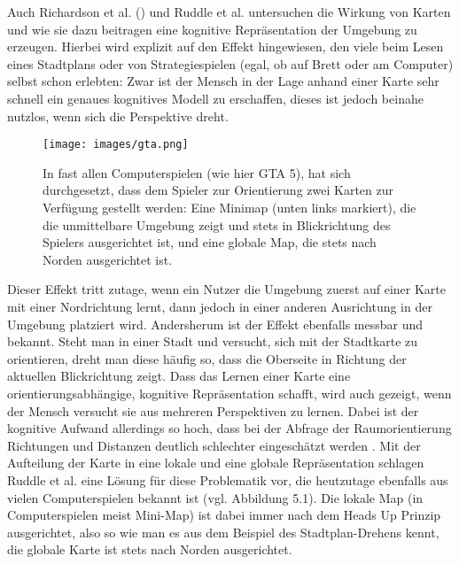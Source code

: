 Auch Richardson et al. (\cite{Richardson1999}) und Ruddle et al. \cite{Ruddle1999TheEnvironments} untersuchen die Wirkung von Karten und wie sie dazu beitragen eine kognitive Repräsentation der Umgebung zu erzeugen.
Hierbei wird explizit auf den Effekt hingewiesen, den viele beim Lesen eines Stadtplans oder von Strategiespielen (egal, ob auf Brett oder am Computer) selbst schon erlebten: Zwar ist der Mensch in der Lage anhand einer Karte sehr schnell ein genaues kognitives Modell zu erschaffen, dieses ist jedoch beinahe nutzlos, wenn sich die Perspektive dreht.


\begin{figure}[h]
  \centering
  \texttt{[image: images/gta.png]}
  \caption{In fast allen Computerspielen (wie hier GTA 5), hat sich durchgesetzt, dass dem Spieler zur Orientierung zwei Karten zur Verfügung gestellt werden: Eine Minimap (unten links markiert), die die unmittelbare Umgebung zeigt und stets in Blickrichtung des Spielers ausgerichtet ist, und eine globale Map, die stets nach Norden ausgerichtet ist.}
  \label{fig:todo}
\end{figure}

Dieser Effekt tritt zutage, wenn ein Nutzer die Umgebung zuerst auf einer Karte mit einer Nordrichtung lernt, dann jedoch in einer anderen Ausrichtung in der Umgebung platziert wird. Andersherum ist der Effekt ebenfalls messbar und bekannt. Steht man in einer Stadt und versucht, sich mit der Stadtkarte zu orientieren, dreht man diese häufig so, dass die Oberseite in Richtung der aktuellen Blickrichtung zeigt. Dass das Lernen einer Karte eine orientierungsabhängige, kognitive Repräsentation schafft, wird auch gezeigt, wenn der Mensch versucht sie aus mehreren Perspektiven zu lernen. Dabei ist der kognitive Aufwand allerdings so hoch, dass bei der Abfrage der Raumorientierung Richtungen und Distanzen deutlich schlechter eingeschätzt werden \cite{Richardson1999}.
Mit der Aufteilung der Karte in eine lokale und eine globale Repräsentation schlagen Ruddle et al. \cite{Ruddle1999TheEnvironments} eine Lösung für diese Problematik vor, die heutzutage ebenfalls aus vielen Computerspielen bekannt ist (vgl. Abbildung 5.1). Die lokale Map (in Computerspielen meist \glqq Mini-Map\grqq{}) ist dabei immer nach dem \glqq Heads Up\grqq{} Prinzip ausgerichtet, also so wie man es aus dem Beispiel des \glqq Stadtplan-Drehens\grqq{} kennt, die globale Karte ist stets nach Norden ausgerichtet.

